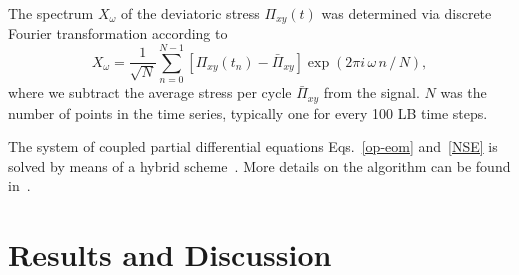\documentclass[aps,pre,reprint,superscriptaddress, twocolumn]{revtex4}
\begin{document}
The spectrum $X_\omega$ of the deviatoric stress $\Pi_{xy}(t)$ was determined via discrete Fourier transformation according to
\begin{equation}
X_\omega=\frac{1}{\sqrt{N}}\sum_{n=0}^{N-1} \left[\Pi_{xy}(t_n) - \bar{\Pi}_{xy}\right] \exp(2\pi i \, \omega \,n\,/\,N),
\label{spectrum}
\end{equation}
where we subtract the average stress per cycle $\bar{\Pi}_{xy}$ from the signal.
$N$ was the number of points in the time series, typically one for every 100 LB time steps. 

The system of coupled partial differential equations Eqs.~\ref{op-eom}
and~\ref{NSE} is solved by means of a
hybrid scheme~\cite{Marenduzzo:2007}. 
More details on the algorithm can
be found in~\cite{Denniston:2001, Denniston:2004}.


\section{Results and Discussion}
\end{document}
